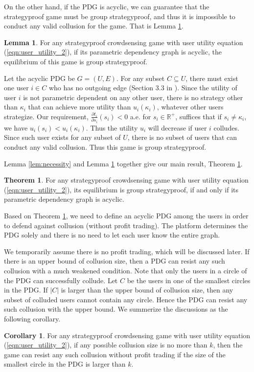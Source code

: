 \documentclass[conference]{IEEEtran}
\theoremstyle{definition}
\newtheorem{theorem}{Theorem}
\newtheorem{lemma}{Lemma}
\newtheorem{corollary}{Corollary}
\begin{document}
On the other hand, if the PDG is acyclic, we can guarantee that the strategyproof game must be group strategyproof, and thus it is impossible to conduct any valid collusion for the game. That is Lemma \ref{lem:sufficiency}.
\begin{lemma}
\label{lem:sufficiency}
For any strategyproof crowdsensing game with user utility equation (\ref{eqn:user_utility_2}), if its parametric dependency graph is acyclic, the  equilibrium of this game is group strategyproof.
\end{lemma}
\begin{IEEEproof}
Let the acyclic PDG be $G=(U,E)$. For any subset $C\subseteq U$, there must exist one user $i\in C$ who has no outgoing edge (Section 3.3 in \cite{dasgupta2006algorithms}). Since the utility of user $i$ is not parametric dependent on any other user, there is no strategy other than $\kappa_i$ that can achieve more utility than $u_i(\kappa_i)$, whatever other users strategize. Our requirement, $\frac{\partial t_i}{\partial s_i}(s_i)<0$ a.e. for $s_i\in\mathbb{R}^+$, suffices that if $s_i\not= \kappa_i$, we have $u_i(s_i)<u_i(\kappa_i)$. Thus the utility $u_i$ will decrease if user $i$ colludes. Since such user exists for any subset of $U$, there is no subset of users that can conduct any valid collusion. Thus this game is group strategyproof.
\end{IEEEproof}

Lemma \ref{lem:necessity} and Lemma \ref{lem:sufficiency} together give our main result, Theorem \ref{thm:main}.
\begin{theorem}
\label{thm:main}
For any strategyproof crowdsensing game with user utility equation (\ref{eqn:user_utility_2}), its equilibrium is group strategyproof, if and only if its parametric dependency graph is acyclic.
\end{theorem}
{\color{blue}
Based on Theorem \ref{thm:main}, we need to define an acyclic PDG among the users in order to defend against collusion (without profit trading). The platform determines the PDG solely and there is no need to let each user know the entire graph. 

We temporarily assume there is no profit trading, which will be discussed later. If there is an upper bound of collusion size, then a PDG can resist any such collusion with a much weakened condition. Note that only the users in a circle of the PDG can successfully collude. Let $C$ be the users in one of the smallest circles in the PDG. If $|C|$ is larger than the upper bound of collusion size, then any subset of colluded users cannot contain any circle. Hence the PDG can resist any such collusion with the upper bound. We summerize the discussions as the following corollary.
\begin{corollary}
For any strategyproof crowdsensing game with user utility equation (\ref{eqn:user_utility_2}), if any possible collusion size is no more than $k$, then the game can resist any such collusion without profit trading if the size of the smallest circle in the PDG is larger than $k$.
\end{corollary}
}
\end{document}
